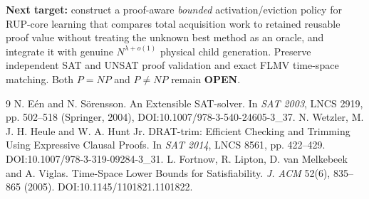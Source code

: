 \documentclass[10pt]{article}
\newcommand{\OPEN}{\textbf{OPEN}}
\begin{document}
\noindent\textbf{Next target:} construct a proof-aware \emph{bounded}
activation/eviction policy for RUP-core learning that compares total
acquisition work to retained reusable proof value without treating the
unknown best method as an oracle, and integrate it with genuine
$N^{\lambda+o(1)}$ physical child generation. Preserve independent SAT and
UNSAT proof validation and exact FLMV time-space matching. Both
$P=NP$ and $P\ne NP$ remain \OPEN.

\begin{thebibliography}{9}
 N. E\'en and N. S\"orensson. An Extensible SAT-solver. In \emph{SAT 2003}, LNCS 2919, pp. 502--518 (Springer, 2004), DOI:10.1007/978-3-540-24605-3\_37.
 N. Wetzler, M. J. H. Heule and W. A. Hunt Jr. DRAT-trim: Efficient Checking and Trimming Using Expressive Clausal Proofs. In \emph{SAT 2014}, LNCS 8561, pp. 422--429. DOI:10.1007/978-3-319-09284-3\_31.
 L. Fortnow, R. Lipton, D. van Melkebeek and A. Viglas. Time-Space Lower Bounds for Satisfiability. \emph{J. ACM} 52(6), 835--865 (2005). DOI:10.1145/1101821.1101822.
\end{thebibliography}
\end{document}
